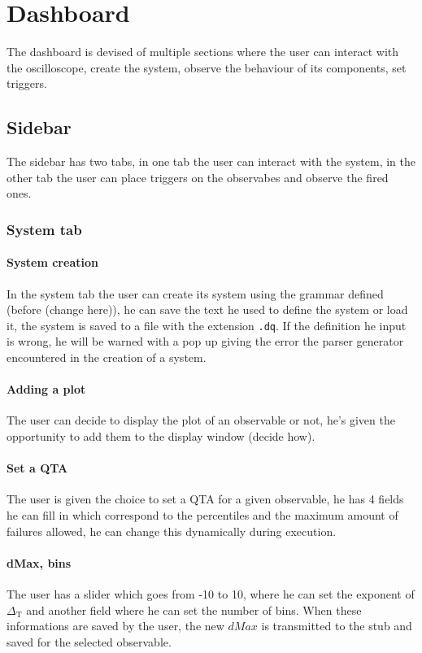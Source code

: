 \section{Dashboard}
    The dashboard is devised of multiple sections where the user can interact with the oscilloscope, create the system, observe the behaviour of its components, set triggers.

    \subsection{Sidebar}
        The sidebar has two tabs, in one tab the user can interact with the system, in the other tab the user can place triggers on the observabes and observe the fired ones.

    \subsubsection{System tab}
    \paragraph{System creation}
        In the system tab the user can create its system using the grammar defined (before (change here)), he can save the text he used to define the system or load it, the system is saved to a file with the extension \texttt{.dq}.
        If the definition he input is wrong, he will be warned with a pop up giving the error the parser generator encountered in the creation of a system.

    \paragraph{Adding a plot}
        The user can decide to display the plot of an observable or not, he's given the opportunity to add them to the display window (decide how).
    \paragraph{Set a QTA}
        The user is given the choice to set a QTA for a given observable, he has 4 fields he can fill in which correspond to the percentiles and the maximum amount of failures allowed, he can change this dynamically during execution.

    \paragraph{dMax, bins}
        The user has a slider which goes from -10 to 10, where he can set the exponent of $\Delta_\text{T}$ and another field where he can set the number of bins. When these informations are saved by the user, the new $dMax$ is transmitted to the stub and saved for the selected observable.

